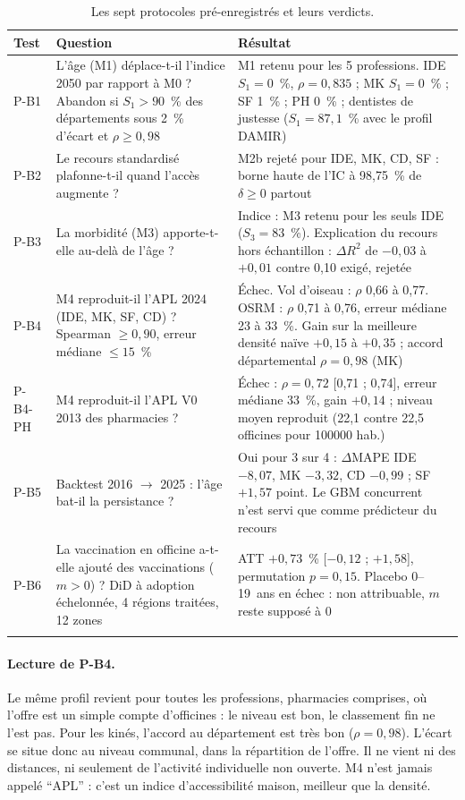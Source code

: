 \documentclass[11pt]{article}
\begin{document}
\begin{longtable}{@{}p{1.3cm}p{5.2cm}p{7.6cm}@{}}
\toprule
\textbf{Test} & \textbf{Question} & \textbf{Résultat} \\
\midrule
\endhead
P-B1 & L'âge (M1) déplace-t-il l'indice 2050 par rapport à M0 ? Abandon si $S_1>90$~\% des départements sous 2~\% d'écart et $\rho\ge0{,}98$ & M1 retenu pour les 5 professions. IDE $S_1=0$~\%\mesure{}, $\rho=0{,}835$\mesure{} ; MK $S_1=0$~\%\mesure{} ; SF 1~\%\mesure{} ; PH 0~\%\mesure{} ; dentistes de justesse ($S_1=87{,}1$~\%\mesure{} avec le profil DAMIR) \\
P-B2 & Le recours standardisé plafonne-t-il quand l'accès augmente ? & M2b rejeté pour IDE, MK, CD, SF : borne haute de l'IC à 98,75~\% de $\delta\ge0$ partout\mesure{} \\
P-B3 & La morbidité (M3) apporte-t-elle au-delà de l'âge ? & Indice : M3 retenu pour les seuls IDE ($S_3=83$~\%\mesure{}). Explication du recours hors échantillon : $\Delta R^2$ de $-0{,}03$ à $+0{,}01$\mesure{} contre 0,10 exigé, rejetée \\
P-B4 & M4 reproduit-il l'APL 2024 (IDE, MK, SF, CD) ? Spearman $\ge0{,}90$, erreur médiane $\le15$~\% & Échec. Vol d'oiseau : $\rho$ 0,66 à 0,77\mesure{}. OSRM : $\rho$ 0,71 à 0,76\mesure{}, erreur médiane 23 à 33~\%\mesure{}. Gain sur la meilleure densité naïve $+0{,}15$ à $+0{,}35$\mesure{} ; accord départemental $\rho=0{,}98$\mesure{} (MK) \\
P-B4-PH & M4 reproduit-il l'APL V0 2013 des pharmacies ? & Échec : $\rho=0{,}72$ [0,71 ; 0,74]\mesure{}, erreur médiane 33~\%\mesure{}, gain $+0{,}14$\mesure{} ; niveau moyen reproduit (22,1 contre 22,5 officines pour \num{100000} hab.\mesure{}) \\
P-B5 & Backtest 2016 $\to$ 2025 : l'âge bat-il la persistance ? & Oui pour 3 sur 4 : $\Delta$MAPE IDE $-8{,}07$, MK $-3{,}32$, CD $-0{,}99$ ; SF $+1{,}57$ point\mesure{}. Le GBM concurrent n'est servi que comme prédicteur du recours \\
P-B6 & La vaccination en officine a-t-elle ajouté des vaccinations ($m>0$) ? DiD à adoption échelonnée, 4 régions traitées, 12 zones & ATT $+0{,}73$~\% [$-0{,}12$ ; $+1{,}58$]\mesure{}, permutation $p=0{,}15$\mesure{}. Placebo 0--19~ans en échec : non attribuable, $m$ reste supposé à 0 \\
\bottomrule
\caption{Les sept protocoles pré-enregistrés et leurs verdicts.}
\end{longtable}

\paragraph{Lecture de P-B4.} Le même profil revient pour toutes les professions, pharmacies comprises, où l'offre est
un simple compte d'officines : le niveau est bon, le classement fin ne l'est pas. Pour les kinés, l'accord au
département est très bon ($\rho=0{,}98$\mesure{}). L'écart se situe donc au niveau communal, dans la répartition de l'offre. Il ne vient ni des distances,
ni seulement de l'activité individuelle non ouverte. M4 n'est jamais appelé \enquote{APL} : c'est un indice
d'accessibilité maison, meilleur que la densité.
\end{document}
